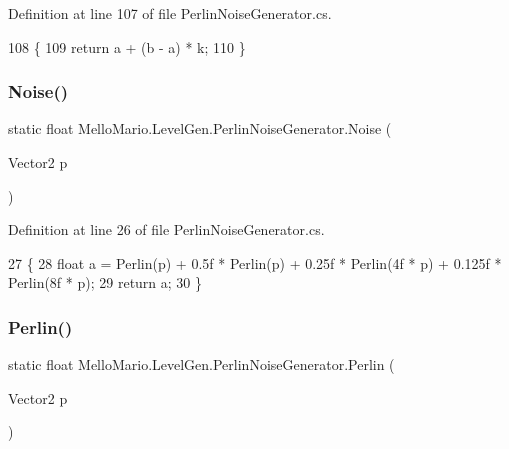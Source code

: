 Definition at line 107 of file Perlin\+Noise\+Generator.\+cs.


\begin{DoxyCode}
108         \{
109             \textcolor{keywordflow}{return} a + (b - a) * k;
110         \}
\end{DoxyCode}
\mbox{\label{classMelloMario_1_1LevelGen_1_1PerlinNoiseGenerator_a8e978325a9573a76780093cb7ccbf4a4}} 
\subsubsection{Noise()}
{\footnotesize\ttfamily static float Mello\+Mario.\+Level\+Gen.\+Perlin\+Noise\+Generator.\+Noise (\begin{DoxyParamCaption}\item[{Vector2}]{p }\end{DoxyParamCaption})\hspace{0.3cm}{\ttfamily [static]}}



Definition at line 26 of file Perlin\+Noise\+Generator.\+cs.


\begin{DoxyCode}
27         \{
28             \textcolor{keywordtype}{float} a = Perlin(p) + 0.5f * Perlin(p) + 0.25f * Perlin(4f * p) + 0.125f * 
      Perlin(8f * p);
29             \textcolor{keywordflow}{return} a;
30         \}
\end{DoxyCode}
\mbox{\label{classMelloMario_1_1LevelGen_1_1PerlinNoiseGenerator_a2b62d0336f6652fb630c17d6f56066bf}} 
\subsubsection{Perlin()}
{\footnotesize\ttfamily static float Mello\+Mario.\+Level\+Gen.\+Perlin\+Noise\+Generator.\+Perlin (\begin{DoxyParamCaption}\item[{Vector2}]{p }\end{DoxyParamCaption})\hspace{0.3cm}{\ttfamily [static]}}



